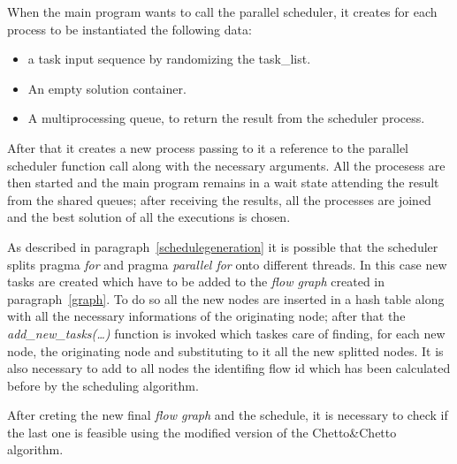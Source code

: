 \documentclass[a4paper,11pt,oneside]{book}
\begin{document}
When the main program wants to call the parallel scheduler, it creates for each process to be instantiated the following data:
\begin{itemize}
\item {a task input sequence by randomizing the task\_list.}
\item{An empty solution container.}
\item{A multiprocessing queue, to return the result from the scheduler process.}
\end{itemize}

After that it creates a new process passing to it a reference to the parallel scheduler function call along with the necessary arguments. All the procesess are then started and the main program remains in a wait state attending the result from the shared queues; after receiving the results, all the processes are joined and the best solution of all the executions is chosen.

As described in paragraph~\ref{schedulegeneration} it is possible that the scheduler splits pragma \emph{for} and pragma \emph{parallel for} onto different threads. In this case new tasks are created which have to be added to the \emph{flow graph} created in paragraph~\ref{graph}. To do so all the new nodes are inserted in a hash table along with all the necessary informations of the originating node; after that the \emph{add\_new\_tasks(\dots)} function is invoked which taskes care of finding, for each new node, the originating node and substituting to it all the new splitted nodes. It is also necessary to add to all nodes the identifing flow id which has been calculated before by the scheduling algorithm.

After creting the new final \emph{flow graph} and the schedule, it is necessary to check if the last one is feasible using the modified version of the Chetto\&Chetto algorithm.
\end{document}
